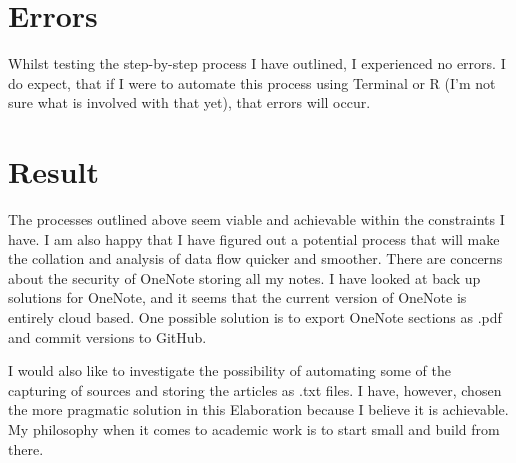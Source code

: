 \documentclass{article}
\begin{document}
\section*{Errors}

Whilst testing the step-by-step process I have outlined, I experienced no errors. I do expect, that if I were to automate this process using Terminal or R (I'm not sure what is involved with that yet), that errors will occur.

\section*{Result}

The processes outlined above seem viable and achievable within the constraints I have. I am also happy that I have figured out a potential process that will make the collation and analysis of data flow quicker and smoother. There are concerns about the security of OneNote storing all my notes. I have looked at back up solutions for OneNote, and it seems that the current version of OneNote is entirely cloud based. One possible solution is to export OneNote sections as .pdf and commit versions to GitHub.

I would also like to investigate the possibility of automating some of the capturing of sources and storing the articles as .txt files. I have, however, chosen the more pragmatic solution in this Elaboration because I believe it is achievable. My philosophy when it comes to academic work is to start small and build from there.
\end{document}
